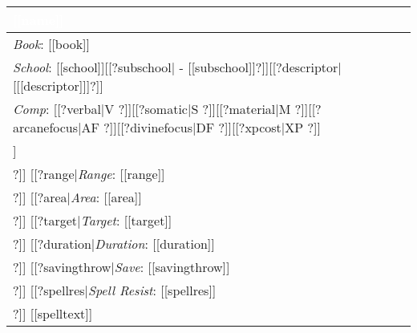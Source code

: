 \noindent
\begin{supertabular}{|p{9cm}|}
\hline
{}\vspace{1mm}\sf\Large\textbf{\textcolor{white}{[[name]]}} \\
\hline
\textit{Book}: [[book]] \\
\hline
\textit{School}: [[school]][[?subschool| - [[subschool]]?]][[?descriptor|[[[descriptor]]]?]]\\
\hline
\textit{Comp}: [[?verbal|V ?]][[?somatic|S ?]][[?material|M ?]][[?arcanefocus|AF ?]][[?divinefocus|DF ?]][[?xpcost|XP ?]]\\
\hline
[[?castingtime|\textit{Casting Time}: [[castingtime]] \\
\hline?]]
[[?range|\textit{Range}: [[range]] \\
\hline?]]
[[?area|\textit{Area}: [[area]] \\
\hline?]]
[[?target|\textit{Target}: [[target]] \\
\hline?]]
[[?duration|\textit{Duration}: [[duration]] \\
\hline?]]
[[?savingthrow|\textit{Save}: [[savingthrow]] \\
\hline?]]
[[?spellres|\textit{Spell Resist}: [[spellres]] \\
\hline?]]
[[spelltext]]\\
\hline
\end{supertabular}

